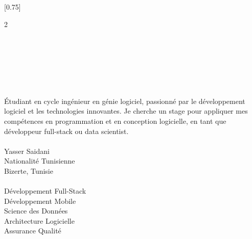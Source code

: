 \documentclass[lighthipster]{simplehipstercv}
\begin{document}
\thispagestyle{empty}


\vspace{0.4em}

\setlength{\columnsep}{1.2cm}
[0.75]
\begin{paracol}{2}
\paracolbackgroundoptions

\footnotesize
{\setasidefontcolour
\raggedleft

\begin{center}
\end{center}
\vspace{0.6em}

\\[0.5em]
\faEnvelope{}\\[0.4em]
\faPhone{}\\[0.4em]
\faGithub{}\\[0.4em]
\faMapMarker{}\\[0.8em]

\\[0.5em]
{\footnotesize
Étudiant en cycle ingénieur en génie
logiciel, passionné par le développement
logiciel et les technologies innovantes.
Je cherche un stage pour appliquer mes
compétences en programmation et en
conception logicielle, en tant que
développeur full-stack ou data scientist.}\\[0.8em]

\\[0.5em]
Yasser Saidani\\[0.3em]
Nationalité Tunisienne\\[0.3em]
Bizerte, Tunisie\\[0.8em]

\\[0.5em]
Développement Full-Stack\\[0.3em]
Développement Mobile\\[0.3em]
Science des Données\\[0.3em]
Architecture Logicielle\\[0.3em]
Assurance Qualité\\[0.8em]

}
\end{paracol}
\end{document}
